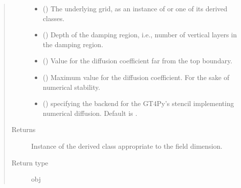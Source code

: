 \documentclass[letterpaper,10pt,english]{sphinxmanual}
\begin{document}
\begin{fulllineitems}
\begin{fulllineitems}
\begin{quote}
\begin{description}
\begin{itemize}
\item {} 
 () \textendash{} The underlying grid, as an instance of {\hyperref[\detokenize{api:grids.grid_xyz.GridXYZ}]{}} or one of its derived classes.

\item {} 
 () \textendash{} Depth of the damping region, i.e., number of vertical layers in the damping region.

\item {} 
 () \textendash{} Value for the diffusion coefficient far from the top boundary.

\item {} 
 () \textendash{} Maximum value for the diffusion coefficient. For the sake of numerical stability.

\item {} 
 () \textendash{}  specifying the backend for the GT4Py’s stencil implementing numerical
diffusion. Default is .

\end{itemize}

\item[{Returns}] \leavevmode
Instance of the derived class appropriate to the field dimension.

\item[{Return type}] \leavevmode
obj

\end{description}\end{quote}

\end{fulllineitems}


\end{fulllineitems}

\end{document}
